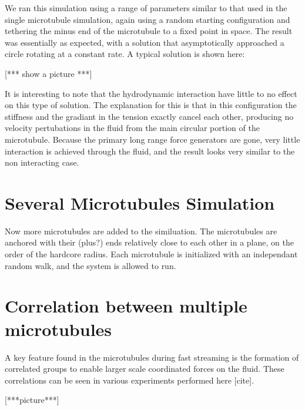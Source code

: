 \documentclass[11pt]{ucthesis}
\begin{document}
We ran this simulation using a range of parameters similar to that used in the single microtubule simulation, again using a random starting configuration and tethering the minus end of the microtubule to a fixed point in space. 
The result was essentially as expected, with a solution that asymptotically approached a circle rotating at a constant rate. A typical solution is shown here:

[*** show a picture ***]

It is interesting to note that the hydrodynamic interaction have little to no effect on this type of solution. 
The explanation for this is that in this configuration the stiffness and the gradiant in the tension exactly cancel each other, producing no velocity pertubations in the fluid from the main circular portion of the microtubule.
Because the primary long range force generators are gone, very little interaction is achieved through the fluid, and the result looks very similar to the non interacting case.

\section{Several Microtubules Simulation}
Now more microtubules are added to the similuation. The microtubules are anchored with their (plus?) ends relatively close to each other in a plane, on the order of the hardcore radius. 
Each microtubule is initialized with an independant random walk, and the system is allowed to run.


\section{Correlation between multiple microtubules}
A key feature found in the microtubules during fast streaming is the formation of correlated groups to enable larger scale coordinated forces on the fluid. These correlations can be seen in various experiments performed here [cite].

[***picture***]
\end{document}
